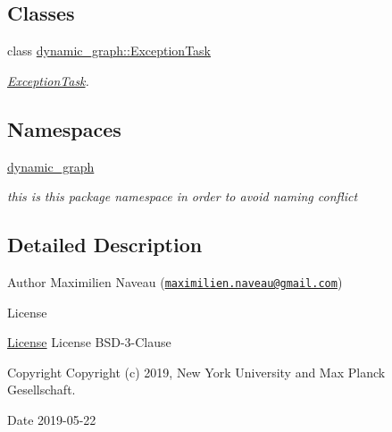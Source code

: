 \subsection*{Classes}
\begin{DoxyCompactItemize}
\item 
class \hyperlink{classdynamic__graph_1_1ExceptionTask}{dynamic\+\_\+graph\+::\+Exception\+Task}
\begin{DoxyCompactList}\small\item\em \hyperlink{classdynamic__graph_1_1ExceptionTask}{Exception\+Task}. \end{DoxyCompactList}\end{DoxyCompactItemize}
\subsection*{Namespaces}
\begin{DoxyCompactItemize}
\item 
 \hyperlink{namespacedynamic__graph}{dynamic\+\_\+graph}
\begin{DoxyCompactList}\small\item\em this is this package namespace in order to avoid naming conflict \end{DoxyCompactList}\end{DoxyCompactItemize}


\subsection{Detailed Description}
\begin{DoxyAuthor}{Author}
Maximilien Naveau (\href{mailto:maximilien.naveau@gmail.com}{\tt maximilien.\+naveau@gmail.\+com}) 
\end{DoxyAuthor}
\begin{DoxyRefDesc}{License}
\item[\hyperlink{license__license000011}{License}]License B\+S\+D-\/3-\/\+Clause \end{DoxyRefDesc}
\begin{DoxyCopyright}{Copyright}
Copyright (c) 2019, New York University and Max Planck Gesellschaft. 
\end{DoxyCopyright}
\begin{DoxyDate}{Date}
2019-\/05-\/22 
\end{DoxyDate}
